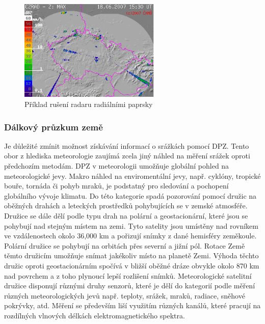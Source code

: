 \documentclass[a4paper,12pt]{article}
\begin{document}
\begin{description}
\begin{figure}[h!]
    \centering
    \includegraphics[width=0.6\textwidth]{./img/srazky/0706181530-gif.png}
    \caption[Rušení radaru]{\centering Příklad rušení radaru radiálními paprsky \footnotemark }
\end{figure}

\end{description}


\subsubsection{Dálkový průzkum země}
Je důležité zmínit možnost získávání informací o srážkách pomocí \acs{DPZ}. Tento obor z hlediska meteorologie zaujímá zcela jiný náhled na měření srážek oproti předchozím metodám. \acs{DPZ} v meteorologii umožňuje globální pohled na meteorologické jevy. Makro náhled na enviromentální jevy, např. cyklóny, tropické bouře, tornáda či pohyb mraků, je podstatný pro sledování a pochopení globálního vývoje klimatu. Do této kategorie spadá pozorování pomocí družic na oběžných drahách a leteckých prostředků pohybujících se v zemské atmosféře. Družice se dále dělí podle typu drah na polární a geostacionární, které jsou se pohybují nad stejným místem na zemi. Tyto satelity jsou umístěny nad rovníkem ve vzdálenostech okolo 36,000 km a pořizují snímky z dané hemisféry zeměkoule. Polární družice se pohybují na orbitách přes severní a jižní pól. Rotace Země těmto družicím umožňuje snímat jakékoliv místo na planetě Zemi. Výhoda těchto družic oproti geostacionárním spočívá v bližší oběžné dráze obvykle okolo 870 km nad povrchem a z toho plynoucí lepší rozlišení snímků. 
Meteorologické satelitní družice disponují různými druhy senzorů, které je dělí do kategorií podle měření různých meteorologických jevů např. teploty, srážek, mraků, radiace, sněhové pokrývky, atd. Měření se především liší  využitím různých kanálů, které pracují na rozdílných vlnových délkách elektromagnetického spektra.
 
\end{document}
